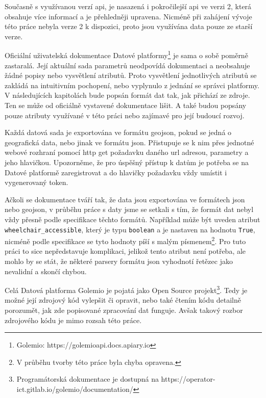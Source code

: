 \bigbreak

Současně s využívanou verzí \gls{api}, je nasazená i pokročilejší \gls{api} ve verzi 2, která obsahuje více informací a je přehledněji upravena. Nicméně při zahájení vývoje této práce nebyla verze 2 k dispozici, proto jsou využívána data pouze ze starší verze.

\bigbreak

Oficiální uživatelská dokumentace Datové platformy\footnote{Golemio: https://golemioapi.docs.apiary.io} je sama o sobě poměrně zastaralá. Její aktuální sada parametrů neodpovídá dokumentaci a neobsahuje žádné popisy nebo vysvětlení atributů. Proto vysvětlení jednotlivých atributů se zakládá na intuitivním pochopení, nebo vyplynulo z jednání se správci platformy. V následujících kapitolách bude popsán formát dat tak, jak přichází ze zdroje. Ten se může od oficiálně vystavené dokumentace lišit. A také budou popsány pouze atributy využívané v této práci nebo zajímavé pro její budoucí rozvoj.

\bigbreak

Každá datová sada je exportována ve formátu \gls{geojson}, pokud se jedná o geografická data, nebo jinak ve formátu \gls{json}. Přistupuje se k nim přes jednotné webové rozhraní pomocí \gls{http} get požadavku daného \gls{url} adresou, parametry a jeho hlavičkou. Upozorněme, že pro úspěšný přístup k datům je potřeba se na Datové platformě zaregistrovat a do hlavičky požadavku vždy umístit i vygenerovaný token.

\bigbreak

Ačkoli se dokumentace tváří tak, že data jsou exportována ve formátech \gls{json} nebo \gls{geojson}, v průběhu práce s daty jsme se setkali s tím, že formát dat nebyl vždy přesně podle specifikace těchto formátů. Například může být uveden atribut \verb"wheelchair_accessible", který je typu \verb"boolean" a je nastaven na hodnotu \verb"True", nicméně podle specifikace se tyto hodnoty píší s malým písmenem\footnote{V průběhu tvorby této práce byla chyba opravena.}. Pro tuto práci to sice nepředstavuje komplikaci, jelikož tento atribut není potřeba, ale mohlo by se stát, že některé parsery formátu \gls{json} vyhodnotí řetězec jako nevalidní a skončí chybou.

\bigbreak

Celá Datová platforma Golemio je pojatá jako Open Source projekt\footnote{Programátorská dokumentace je dostupná na https://operator-ict.gitlab.io/golemio/documentation/}. Tedy je možné její zdrojový kód vylepšit či opravit, nebo také čtením kódu detailně porozumět, jak zde popisované zpracování dat funguje. Avšak takový rozbor zdrojového kódu je mimo rozsah této práce.

